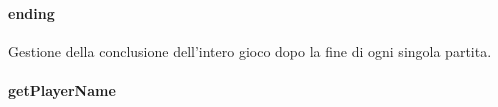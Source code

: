 \documentclass[letterpaper,10pt,italian,openany,oneside]{sphinxmanual}
\begin{document}
\paragraph{ending}
\label{\detokenize{test/it/unicam/cs/pa/mastermind/ui/StartView:ending}}

\begin{fulllineitems}
\label{\detokenize{test/it/unicam/cs/pa/mastermind/ui/StartView:it.unicam.cs.pa.mastermind.ui.StartView.ending()}}
Gestione della conclusione dell’intero gioco dopo la fine di ogni singola partita.

\end{fulllineitems}



\paragraph{getPlayerName}
\label{\detokenize{test/it/unicam/cs/pa/mastermind/ui/StartView:getplayername}}
\end{document}

